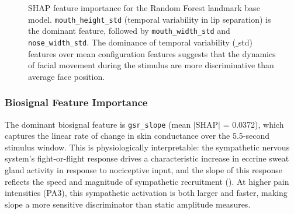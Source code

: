 \documentclass[10pt, twocolumn]{article}
\begin{document}
\begin{figure}[t]
\centering
{}
\caption{SHAP feature importance for the Random Forest landmark base model.
\texttt{mouth\_height\_std} (temporal variability in lip separation) is the dominant
feature, followed by \texttt{mouth\_width\_std} and \texttt{nose\_width\_std}. The
dominance of temporal variability ($\_$std) features over mean configuration features
suggests that the dynamics of facial movement during the stimulus are more discriminative
than average face position.}
\label{fig:shap_lm}
\end{figure}

\subsubsection{Biosignal Feature Importance}

The dominant biosignal feature is \texttt{gsr\_slope} (mean $|\text{SHAP}|$ = 0.0372),
which captures the linear rate of change in skin conductance over the 5.5-second stimulus
window. This is physiologically interpretable: the sympathetic nervous system's
fight-or-flight response drives a characteristic increase in eccrine sweat gland activity
in response to nociceptive input, and the slope of this response reflects the speed and
magnitude of sympathetic recruitment (\cite{Fowles1986}). At higher pain intensities
(PA3), this sympathetic activation is both larger and faster, making slope a more sensitive
discriminator than static amplitude measures.
\end{document}
